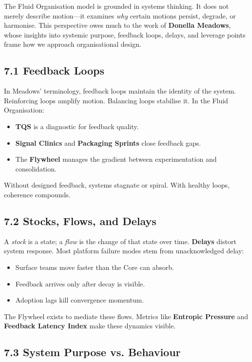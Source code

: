 \documentclass[12pt]{article}
\begin{document}
The Fluid Organisation model is grounded in systems thinking. It does not merely describe motion—it examines \textit{why} certain motions persist, degrade, or harmonise. This perspective owes much to the work of \textbf{Donella Meadows}, whose insights into systemic purpose, feedback loops, delays, and leverage points frame how we approach organisational design.

\subsection*{7.1 Feedback Loops}

In Meadows’ terminology, feedback loops maintain the identity of the system. Reinforcing loops amplify motion. Balancing loops stabilise it. In the Fluid Organisation:
\begin{itemize}
    \item \textbf{TQS} is a diagnostic for feedback quality.
    \item \textbf{Signal Clinics} and \textbf{Packaging Sprints} close feedback gaps.
    \item The \textbf{Flywheel} manages the gradient between experimentation and consolidation.
\end{itemize}

Without designed feedback, systems stagnate or spiral. With healthy loops, coherence compounds.

\subsection*{7.2 Stocks, Flows, and Delays}

A \textit{stock} is a state; a \textit{flow} is the change of that state over time. \textbf{Delays} distort system response. Most platform failure modes stem from unacknowledged delay:
\begin{itemize}
    \item Surface teams move faster than the Core can absorb.
    \item Feedback arrives only after decay is visible.
    \item Adoption lags kill convergence momentum.
\end{itemize}

The Flywheel exists to mediate these flows. Metrics like \textbf{Entropic Pressure} and \textbf{Feedback Latency Index} make these dynamics visible.

\subsection*{7.3 System Purpose vs. Behaviour}
\end{document}
